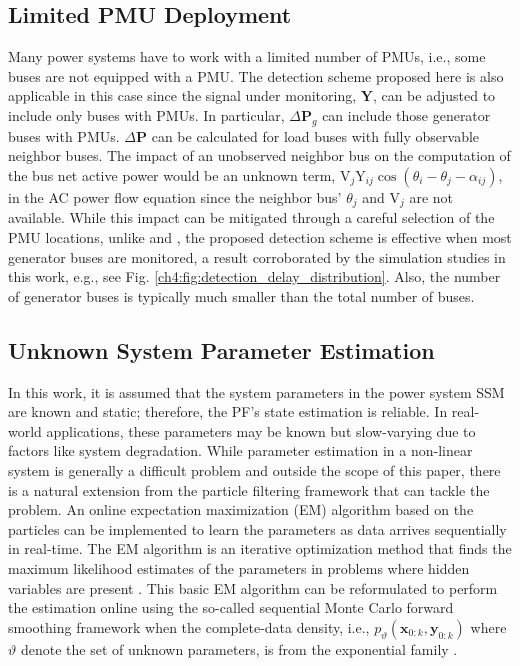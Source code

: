 \subsection{Limited PMU Deployment}
Many power systems have to work with a limited number of PMUs, i.e., some buses are not equipped with a PMU. The detection scheme proposed here is also applicable in this case since the signal under monitoring, $\boldsymbol{Y}$, can be adjusted to include only buses with PMUs. In particular, $\Delta\textbf{P}_{g}$ can include those generator buses with PMUs. $\Delta\textbf{P}$ can be calculated for load buses with fully observable neighbor buses. The impact of an unobserved neighbor bus on the computation of the bus net active power would be an unknown term, $\text{V}_j \text{Y}_{ij} \cos (\theta_i - \theta_j - \alpha_{ij})$, in the AC power flow equation since the neighbor bus' $\theta_j$ and $\text{V}_j$ are not available. While this impact can be mitigated through a careful selection of the PMU locations, unlike \cite{Chen2016} and \cite{yang2020control}, the proposed detection scheme is effective when most generator buses are monitored, a result corroborated by the simulation studies in this work, e.g., see Fig. \ref{ch4:fig:detection_delay_distribution}. Also, the number of generator buses is typically much smaller than the total number of buses.

\subsection{Unknown System Parameter Estimation}
In this work, it is assumed that the system parameters in the power system SSM are known and static; therefore, the PF's state estimation is reliable. In real-world applications, these parameters may be known but slow-varying due to factors like system degradation. While parameter estimation in a non-linear system is generally a difficult problem and outside the scope of this paper, there is a natural extension from the particle filtering framework that can tackle the problem. An online expectation maximization (EM) algorithm based on the particles can be implemented to learn the parameters as data arrives sequentially in real-time. The EM algorithm is an iterative optimization method that finds the maximum likelihood estimates of the parameters in problems where hidden variables are present \cite{dempster1977maximum}. This basic EM algorithm can be reformulated to perform the estimation online using the so-called sequential Monte Carlo forward smoothing framework when the complete-data density, i.e., $p_\vartheta(\boldsymbol{x}_{0:k}, {\boldsymbol{y}}_{0:k})$ where $\vartheta$ denote the set of unknown parameters, is from the exponential family \cite{yildirim2013online}.


